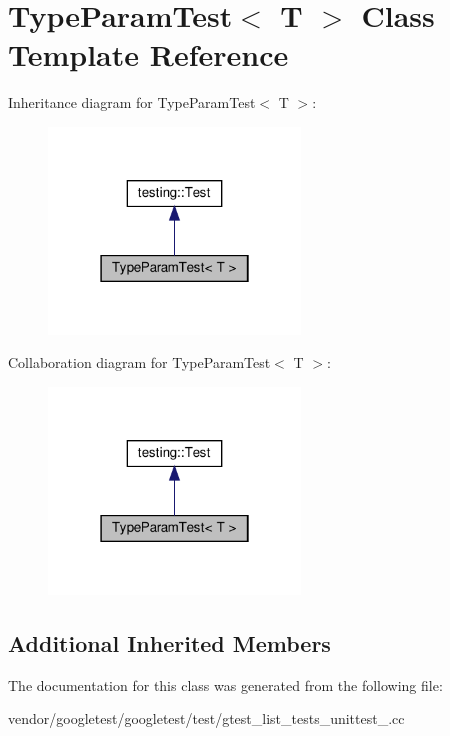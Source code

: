 \hypertarget{class_type_param_test}{}\section{Type\+Param\+Test$<$ T $>$ Class Template Reference}
\label{class_type_param_test}


Inheritance diagram for Type\+Param\+Test$<$ T $>$\+:
\nopagebreak
\begin{figure}[H]
\begin{center}
\leavevmode
\includegraphics[width=190pt]{class_type_param_test__inherit__graph}
\end{center}
\end{figure}


Collaboration diagram for Type\+Param\+Test$<$ T $>$\+:
\nopagebreak
\begin{figure}[H]
\begin{center}
\leavevmode
\includegraphics[width=190pt]{class_type_param_test__coll__graph}
\end{center}
\end{figure}
\subsection*{Additional Inherited Members}


The documentation for this class was generated from the following file\+:\begin{DoxyCompactItemize}
\item 
vendor/googletest/googletest/test/gtest\+\_\+list\+\_\+tests\+\_\+unittest\+\_\+.\+cc\end{DoxyCompactItemize}
